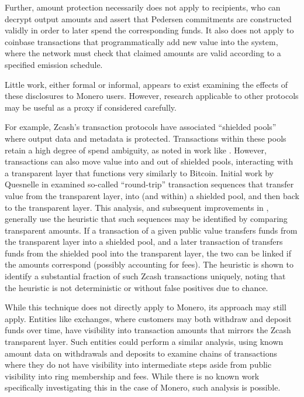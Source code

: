 \documentclass{article}
\theoremstyle{definition}
\begin{document}
Further, amount protection necessarily does not apply to recipients, who can decrypt output amounts and assert that Pedersen commitments are constructed validly in order to later spend the corresponding funds.
It also does not apply to coinbase transactions that programmatically add new value into the system, where the network must check that claimed amounts are valid according to a specified emission schedule.

Little work, either formal or informal, appears to exist examining the effects of these disclosures to Monero users.
However, research applicable to other protocols may be useful as a proxy if considered carefully.

For example, Zcash's transaction protocols have associated ``shielded pools'' where output data and metadata is protected.
Transactions within these pools retain a high degree of spend ambiguity, as noted in work like \cite{wicht2023transaction}.
However, transactions can also move value into and out of shielded pools, interacting with a transparent layer that functions very similarly to Bitcoin.
Initial work by Quesnelle in \cite{quesnelle2017linkabilityzcashtransactions} examined so-called ``round-trip'' transaction sequences that transfer value from the transparent layer, into (and within) a shielded pool, and then back to the transparent layer.
This analysis, and subsequent improvements in \cite{kappos2018empirical}, generally use the heuristic that such sequences may be identified by comparing transparent amounts.
If a transaction of a given public value transfers funds from the transparent layer into a shielded pool, and a later transaction of transfers funds from the shielded pool into the transparent layer, the two can be linked if the amounts correspond (possibly accounting for fees).
The heuristic is shown to identify a substantial fraction of such Zcash transactions uniquely, noting that the heuristic is not deterministic or without false positives due to chance.

While this technique does not directly apply to Monero, its approach may still apply.
Entities like exchanges, where customers may both withdraw and deposit funds over time, have visibility into transaction amounts that mirrors the Zcash transparent layer.
Such entities could perform a similar analysis, using known amount data on withdrawals and deposits to examine chains of transactions where they do not have visibility into intermediate steps aside from public visibility into ring membership and fees.
While there is no known work specifically investigating this in the case of Monero, such analysis is possible.
\end{document}
